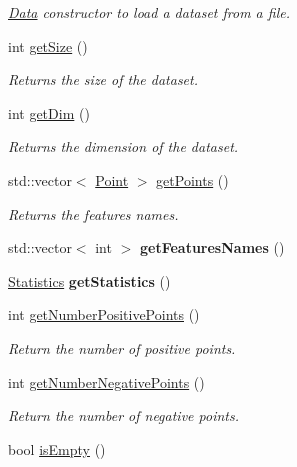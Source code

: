 \begin{DoxyCompactItemize}
\begin{DoxyCompactList}\small\item\em \hyperlink{class_data}{Data} constructor to load a dataset from a file. \end{DoxyCompactList}\item 
int \hyperlink{class_data_abfd7c7cca66a186ff45efa430bcb2f1e}{get\+Size} ()
\begin{DoxyCompactList}\small\item\em Returns the size of the dataset. \end{DoxyCompactList}\item 
int \hyperlink{class_data_a0391940729a8023ea9b154132a854d35}{get\+Dim} ()
\begin{DoxyCompactList}\small\item\em Returns the dimension of the dataset. \end{DoxyCompactList}\item 
std\+::vector$<$ \hyperlink{class_point}{Point} $>$ \hyperlink{class_data_a8fe9ce813848765a7615b909c4654b55}{get\+Points} ()
\begin{DoxyCompactList}\small\item\em Returns the features names. \end{DoxyCompactList}\item 
\mbox{\label{class_data_a728c2d3d71d759b252af8820f9f7d135}} 
std\+::vector$<$ int $>$ {\bfseries get\+Features\+Names} ()
\item 
\mbox{\label{class_data_a26376768a100f1999ef3ac15a2aa2a67}} 
\hyperlink{class_statistics}{Statistics} {\bfseries get\+Statistics} ()
\item 
int \hyperlink{class_data_a45a39ab2144bcdd0ac1aa67d7d08a6cc}{get\+Number\+Positive\+Points} ()
\begin{DoxyCompactList}\small\item\em Return the number of positive points. \end{DoxyCompactList}\item 
int \hyperlink{class_data_a5166e74e946c2dbac75f383d63f018ea}{get\+Number\+Negative\+Points} ()
\begin{DoxyCompactList}\small\item\em Return the number of negative points. \end{DoxyCompactList}\item 
bool \hyperlink{class_data_a93468d3b8b2ce0f73e369e5de160534e}{is\+Empty} ()

\end{DoxyCompactItemize}
